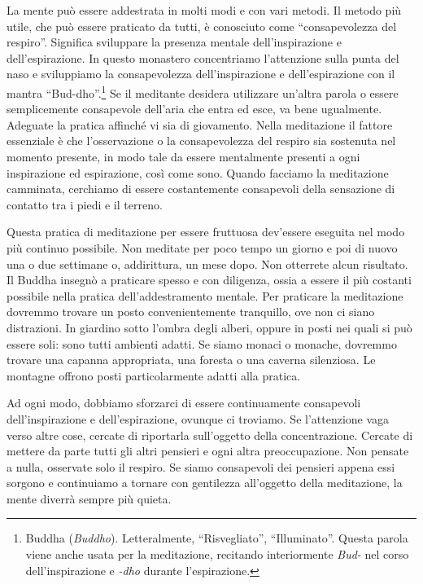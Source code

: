 La mente può essere addestrata in molti modi e con vari metodi. Il
metodo più utile, che può essere praticato da tutti, è conosciuto come
``consapevolezza del respiro''. Significa sviluppare la presenza mentale
dell'inspirazione e dell'espirazione. In questo monastero concentriamo
l'attenzione sulla punta del naso e sviluppiamo la consapevolezza
dell'inspirazione e dell'espirazione con il mantra
``Bud-dho''.\footnote{Buddha (\emph{Buddho}). Letteralmente,
  ``Risvegliato'', ``Illuminato''. Questa parola viene anche usata per
  la meditazione, recitando interiormente \emph{Bud-} nel corso
  dell'inspirazione e \emph{-dho} durante l'espirazione.} Se il
meditante desidera utilizzare un'altra parola o essere semplicemente
consapevole dell'aria che entra ed esce, va bene ugualmente. Adeguate la
pratica affinché vi sia di giovamento. Nella meditazione il fattore
essenziale è che l'osservazione o la consapevolezza del respiro sia
sostenuta nel momento presente, in modo tale da essere mentalmente
presenti a ogni inspirazione ed espirazione, così come sono. Quando
facciamo la meditazione camminata, cerchiamo di essere costantemente
consapevoli della sensazione di contatto tra i piedi e il terreno.

Questa pratica di meditazione per essere fruttuosa dev'essere eseguita
nel modo più continuo possibile. Non meditate per poco tempo un giorno e
poi di nuovo una o due settimane o, addirittura, un mese dopo. Non
otterrete alcun risultato. Il Buddha insegnò a praticare spesso e con
diligenza, ossia a essere il più costanti possibile nella pratica
dell'addestramento mentale. Per praticare la meditazione dovremmo
trovare un posto convenientemente tranquillo, ove non ci siano
distrazioni. In giardino sotto l'ombra degli alberi, oppure in posti nei
quali si può essere soli: sono tutti ambienti adatti. Se siamo monaci o
monache, dovremmo trovare una capanna appropriata, una foresta o una
caverna silenziosa. Le montagne offrono posti particolarmente adatti
alla pratica.

Ad ogni modo, dobbiamo sforzarci di essere continuamente consapevoli
dell'inspirazione e dell'espirazione, ovunque ci troviamo. Se
l'attenzione vaga verso altre cose, cercate di riportarla sull'oggetto
della concentrazione. Cercate di mettere da parte tutti gli altri
pensieri e ogni altra preoccupazione. Non pensate a nulla, osservate
solo il respiro. Se siamo consapevoli dei pensieri appena essi sorgono e
continuiamo a tornare con gentilezza all'oggetto della meditazione, la
mente diverrà sempre più quieta.

